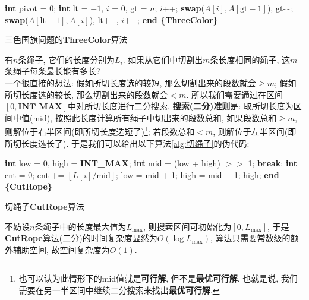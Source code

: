 \documentclass{article}
\begin{document}
\begin{homeworkProblem}
\begin{algorithm}[H]
\begin{algorithmic}[1]
	\State \textbf{int} pivot = 0;
	\State \textbf{int} lt = $-1$, $i$ = 0, gt = $n$;
			\State $i$++;
			\State \textbf{swap}($A[i],A[\text{gt}-1]$), gt$\text{-\,-}$;
			\State \textbf{swap}($A[\text{lt}+1],A[i]$), lt$\text{++}$, $i\text{++}$;
		\EndIf
	\EndWhile
	\State \textbf{end \{ThreeColor\}}
	\end{algorithmic}
	\caption{三色国旗问题的\textbf{ThreeColor}算法}
	\label{alg:三色国旗算法}
\end{algorithm}
\end{homeworkProblem}

\pagebreak

\begin{homeworkProblem}
	有$n$条绳子, 它们的长度分别为$L_i$. 如果从它们中切割出$m$条长度相同的绳子, 这$m$条绳子每条最长能有多长?
	\\

	\solution 一个很直接的想法: 假如所切长度选的较短, 那么切割出来的段数就会$\geq m$; 假如所切长度选的较长, 那么切割出来的段数就会$<m$. 所以我们需要通过在区间$[0,\textbf{INT_MAX}]$中对所切长度进行二分搜索. \textbf{搜索(二分)准则}是: 取所切长度为区间中值(mid), 按照此长度计算所有绳子中切出来的段数总和, 如果段数总和$\geq m$, 则解位于右半区间(即所切长度选短了)\footnote{也可以认为此情形下的mid值就是\textbf{可行解}, 但不是\textbf{最优可行解}. 也就是说, 我们需要在另一半区间中继续二分搜索来找出\textbf{最优可行解}.}; 若段数总和$<m$, 则解位于左半区间(即所切长度选长了). 于是我们可以给出以下算法\ref{alg:切绳子}的伪代码: 
	\begin{algorithm}[H]
		\begin{algorithmic}[1]
		\State \textbf{int} low = 0, high = \textbf{INT_MAX}; 
			\State \textbf{int} mid = (low + high) $>>$ 1;
				\State \textbf{break}; 
			\EndIf
			\State \textbf{int} cnt = 0; 
				\State cnt += $\left\lfloor L[i]/\text{mid}\right\rfloor $; 
			\EndFor
			 
				\State low = mid + 1;
			\Else {}
				\State high = mid $-$ 1;
			\EndIf
		\EndWhile
		\State \Return high; 
		\State \textbf{end \{CutRope\}}
		\end{algorithmic}
		\caption{切绳子\textbf{CutRope}算法}
		\label{alg:切绳子}
	\end{algorithm}
	不妨设$n$条绳子中的长度最大值为$L_{\text{max}}$, 则搜索区间可初始化为$[0,L_{\text{max}}]$, 于是\textbf{CutRope}算法(二分)的时间复杂度显然为$O(\log L_{\text{max}})$, 算法只需要常数级的额外辅助空间, 故空间复杂度为$O(1)$.


\end{homeworkProblem}
\end{document}
